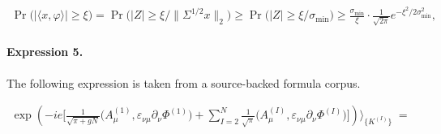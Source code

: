 \documentclass[11pt]{article}
\begin{document}
\begin{align*}\operatorname{Pr}\Big(|\langle x,\varphi\rangle|\geq\xi\Big)=\operatorname{Pr}\Big(|Z|\geq\xi/\|\Sigma^{1/2}x\|_2\Big)\geq\operatorname{Pr}\Big(|Z|\geq\xi/\sigma_\mathrm{min}\Big)\geq\frac{\sigma_\mathrm{min}}{\xi}\cdot\frac{1}{\sqrt{2\pi}}e^{-\xi^2/2\sigma_\mathrm{min}^2},\end{align*}

\paragraph{Expression 5.} The following expression is taken from a source-backed formula corpus.

\begin{align*}\exp \left( - i e \Bigg[ \frac{1}{\sqrt{\pi\!+\!gN}}\Big( A^{(1)}_\mu, \varepsilon_{\nu \mu} \partial_\nu \Phi^{(1)} \Big) +\sum_{I=2}^N \frac{1}{\sqrt{\pi}}\Big( A^{(I)}_\mu, \varepsilon_{\nu \mu} \partial_\nu \Phi^{(I)} \Big) \Bigg]\right) \Bigg\rangle_{\{K^{(I)}\}} \; =\end{align*}
\end{document}
